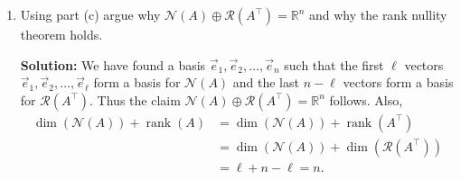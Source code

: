 \documentclass[10pt]{article}
\theoremstyle{definition}
\theoremstyle{plain}
\newcommand{\RR}{\mathbb{R}}
\newcommand{\NN}{\mathcal{N}}
\newcommand{\Range}{\mathcal{R}}
\DeclareMathOperator{\rank}{rank}
\DeclareMathOperator{\spn}{span}
\newcommand{\vv}[1]{\vec{#1}}
\begin{document}
\begin{enumerate}[label=(\alph*)]
\begin{enumerate}[label=\roman*.]
\textit{HINT: Second, you can use without proof the fact that for two subspaces, $\mathcal{S}_1$ and $\mathcal{S}_2$, if $\mathcal{S}_1 \subseteq \mathcal{S}_2$ and $\dim(\mathcal{S}_1) = \dim(\mathcal{S}_2)$ then $\mathcal{S}_1 = \mathcal{S}_2$.}

\textbf{Solution:} Assume the contrary and let $\vv{f}_1, \ldots, \vv{f}_k$ be an orthonormal basis for $\Range\!\left(A^\top\right)$. Then, there exists $\vv{u}$ in the span of $\vv{e}_{\ell+1}, \ldots, \vv{e}_n$ such that $\vv{u} \notin \Range\!\left(A^\top\right)$. From this, we get $\vv{u}_\perp = \vv{u} - \sum_{i=1}^{k} (\vv{f}_i^\top \vv{u}) \vv{f}_i$ is non-zero and orthogonal to $\Range\!\left(A^\top\right)$. Visually, you can think of the range of $A^\top$ as the $x, y$ plane, and $\vv{u}$ extends into 3D space outside this plane. From there, we can define a $\vv{u}_\perp$ that is perpendicular to the $x, y$ plane simply by using Gram-Schmidt on the basis vectors, for example. Thus, $\vv{u}_\perp \in \Range\!\left(A^\top\right)^\perp = \NN(A)$. However, we also have $\vv{u}_\perp \in \spn(\vv{e}_{\ell+1}, \ldots, \vv{e}_n)$ which is a contradiction as $\NN(A)$ and $\spn(\vv{e}_{\ell+1}, \ldots, \vv{e}_n)$ are orthogonal to each other. Therefore, the dimension of $\Range\!\left(A^\top\right)$ is at least $n - \ell$ and is exactly $n - \ell$ as it is contained in an $n - \ell$ dimensional space. Since, we have $\Range\!\left(A^\top\right) \subseteq \spn(\vv{e}_{\ell+1} \ldots \vv{e}_n)$, and $\dim\!\left(\Range\!\left(A^\top\right)\right) = \dim(\spn(\vv{e}_{\ell+1} \ldots \vv{e}_n)) = n - \ell$, we can conclude that $\Range\!\left(A^\top\right) = \spn(\vv{e}_{\ell+1}, \ldots, \vv{e}_n)$.
\end{enumerate}

\item Using part (c) argue why $\NN(A) \oplus \Range\!\left(A^\top\right) = \RR^n$ and why the rank nullity theorem holds.

\textbf{Solution:} We have found a basis $\vv{e}_1, \vv{e}_2, \ldots, \vv{e}_n$ such that the first $\ell$ vectors $\vv{e}_1, \vv{e}_2, \ldots, \vv{e}_\ell$ form a basis for $\NN(A)$ and the last $n - \ell$ vectors form a basis for $\Range\!\left(A^\top\right)$. Thus the claim $\NN(A) \oplus \Range\!\left(A^\top\right) = \RR^n$ follows. Also,
\begin{align}
\dim(\NN(A)) + \rank(A) &= \dim(\NN(A)) + \rank\!\left(A^\top\right) \\
&= \dim(\NN(A)) + \dim\!\left(\Range\!\left(A^\top\right)\right) \\
&= \ell + n - \ell = n.
\end{align}
\end{enumerate}
\end{document}
